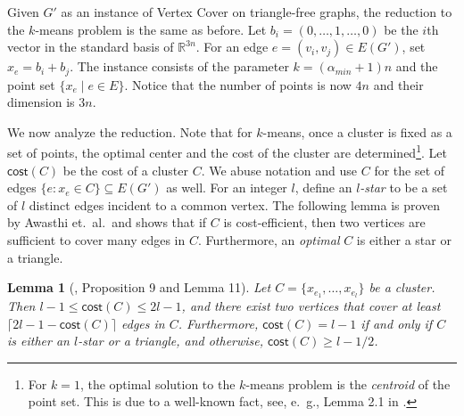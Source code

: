 \documentclass{scrartcl}
\newtheorem{lemma}[theorem]{Lemma}
\newcommand{\cost}{\mathsf{cost}}
\begin{document}
Given $G'$ as an instance of Vertex Cover on triangle-free graphs, the reduction to the $k$-means problem is the same as before. 
Let $b_i=(0,\ldots,1,\ldots,0)$ be the $i$th vector in the standard basis of $\mathbb{R}^{3n}$. For an edge $e=(v_i,v_j)\in E(G')$, set $x_e=b_i+b_j$. The instance consists of the parameter $k = (\alpha_{min} + 1)n$ and the point set $\{x_e \mid e \in E\}$. Notice that the number of points is now $4n$ and their dimension is $3n$. 

We now analyze the reduction. 
Note that for $k$-means, once a cluster is fixed as a set of points, the optimal center and the cost of the cluster are determined\footnote{For $k=1$, the optimal solution to the $k$-means problem is the \emph{centroid} of the point set. This is due to a well-known fact, see, e.\ g., Lemma 2.1 in \cite{KMNPSW04}.}. 
Let $\cost(C)$ be the cost of a cluster $C$. 
We abuse notation and use $C$ for the set of edges $\{ e : x_e \in C \} \subseteq E(G')$ as well. 
For an integer $l$, define an \emph{$l$-star} to be a set of $l$ distinct edges incident to a common vertex. 
The following lemma is proven by Awasthi et.\ al.\ and shows that if $C$ is cost-efficient, then two vertices are sufficient to cover many edges in $C$. Furthermore, an {\em optimal} $C$ is either a star or a triangle. 

\begin{lemma}[\cite{ACKS15}, Proposition 9 and Lemma 11]\label{lem:cost}
Let $C = \{ x_{e_1}, \dots, x_{e_l} \}$ be a cluster. 
Then $l - 1 \leq \cost(C) \leq 2l - 1$, and there exist two vertices that cover at least $\lceil 2l - 1 - \cost(C) \rceil$ edges in $C$.
Furthermore, $\cost(C) = l - 1$ if and only if $C$ is either an $l$-star or a triangle, and otherwise, $\cost(C) \ge l- 1/2$.
\end{lemma}
\end{document}
